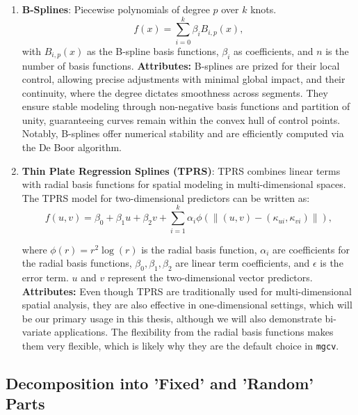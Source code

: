 \documentclass[12pt, twoside,hidelinks]{article}
\theoremstyle{definition}
\numberwithin{equation}{section}
\begin{document}
\begin{enumerate}
    \item \textbf{B-Splines}:
    Piecewise polynomials of degree \( p \) over \( k \) knots.
    \begin{equation}
         f(x) = \sum_{i=0}^{k} \beta_i B_{i,p}(x),
         \label{eq:B_splines}
    \end{equation}
    with \( B_{i,p}(x) \) as the B-spline basis functions, \( \beta_i \) as coefficients, and \( n \) is the number of basis functions.
    \newline
    \textbf{Attributes:}
    B-splines are prized for their local control, allowing precise adjustments with minimal global impact, and their continuity, where the degree dictates smoothness across segments. They ensure stable modeling through non-negative basis functions and partition of unity, guaranteeing curves remain within the convex hull of control points. Notably, B-splines offer numerical stability and are efficiently computed via the De Boor algorithm.


    \item \textbf{Thin Plate Regression Splines (TPRS)}:
    TPRS combines linear terms with radial basis functions for spatial modeling in multi-dimensional spaces. The TPRS model for two-dimensional predictors can be written as:
    \begin{equation}
       f(u,v) = \beta_0 + \beta_1 u + \beta_2 v + \sum_{i=1}^{k} \alpha_i \phi(\| (u, v) - (\kappa_{ui}, \kappa_{vi}) \|),
       \label{eq:tprs_splines}
    \end{equation}
    
    
    where \( \phi(r) = r^2 \log(r) \) is the radial basis function, \( \alpha_i \) are coefficients for the radial basis functions, \( \beta_0, \beta_1, \beta_2 \) are linear term coefficients, and \( \epsilon \) is the error term. \( u \) and \( v \) represent the two-dimensional vector predictors.
    \newline
    \textbf{Attributes:}
    Even though TPRS are traditionally used for multi-dimensional spatial analysis, they are also effective in one-dimensional settings, which will be our primary usage in this thesis, although we will also demonstrate bi-variate applications. The flexibility from the radial basis functions makes them very flexible, which is likely why they are the default choice in \texttt{mgcv}.

\end{enumerate}

\subsection{Decomposition into 'Fixed' and 'Random' Parts}\label{sec:smooth:dec}
\end{document}
